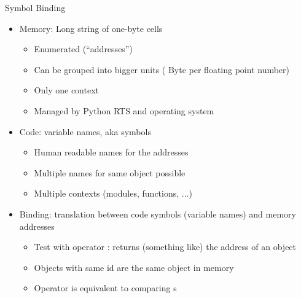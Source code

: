 \begin{frame}{Symbol Binding}
%
\begin{itemize}
\item Memory: Long string of one-byte cells
	\begin{itemize}
	\item Enumerated (\enquote{addresses})
	\item Can be grouped into bigger units (\Thus {} Byte per floating point number)
	\item Only one context
	\item Managed by Python RTS and operating system
	\end{itemize}
\item Code: variable names, aka symbols
	\begin{itemize}
	\item Human readable names for the addresses
	\item Multiple names for same object possible
	\item Multiple contexts (modules, functions, ...)
	\end{itemize}
\item[\Thus] Binding: translation between code symbols (\zB variable names) and memory addresses
	\begin{itemize}
	\item Test with operator : returns (something like) the address of an object
	\item Objects with same id are the same object in memory
	\item Operator  is equivalent to comparing s
	\end{itemize}
\end{itemize}
%
\end{frame}


